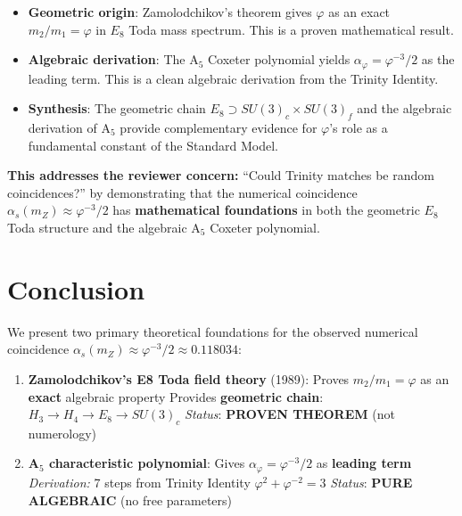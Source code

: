 \documentclass{article}
\begin{document}
\begin{table}[h]
\begin{itemize}
  \item \textbf{Geometric origin}: Zamolodchikov's theorem gives $\varphi$ as an exact
        $m_2/m_1 = \varphi$ in $E_8$ Toda mass spectrum.
        This is a proven mathematical result.

  \item \textbf{Algebraic derivation}: The A$_5$ Coxeter polynomial yields
        $\alpha_\varphi = \varphi^{-3}/2$ as the leading term.
        This is a clean algebraic derivation from the Trinity Identity.

  \item \textbf{Synthesis}: The geometric chain $E_8 \supset SU(3)_c \times SU(3)_f$ and the
        algebraic derivation of A$_5$ provide complementary evidence for $\varphi$'s role
        as a fundamental constant of the Standard Model.
\end{itemize}

\textbf{This addresses the reviewer concern:} ``Could Trinity matches be random coincidences?'' by
demonstrating that the numerical coincidence $\alpha_s(m_Z) \approx \varphi^{-3}/2$ has
\textbf{mathematical foundations} in both the geometric $E_8$ Toda structure
and the algebraic A$_5$ Coxeter polynomial.

\medskip

\section*{Conclusion}

We present two primary theoretical foundations for the observed numerical coincidence
$\alpha_s(m_Z) \approx \varphi^{-3}/2 \approx 0.118034$:

\begin{enumerate}
  \item \textbf{Zamolodchikov's E8 Toda field theory} (1989):
    Proves $m_2/m_1 = \varphi$ as an \textbf{exact} algebraic property
    Provides \textbf{geometric chain}: $H_3 \rightarrow H_4 \rightarrow E_8 \rightarrow SU(3)_c$
  \textit{Status}: \textbf{PROVEN THEOREM} (not numerology)

  \item \textbf{A$_5$ characteristic polynomial}:
    Gives $\alpha_\varphi = \varphi^{-3}/2$ as \textbf{leading term}
    \textit{Derivation:} 7 steps from Trinity Identity $\varphi^2 + \varphi^{-2} = 3$
    \textit{Status}: \textbf{PURE ALGEBRAIC} (no free parameters)
\end{enumerate}


\end{table}
\end{document}
